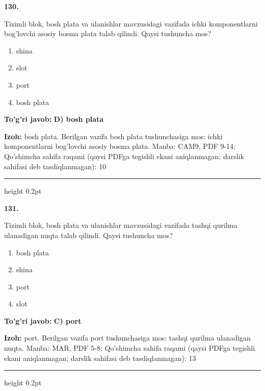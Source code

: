 \documentclass[10pt,a4paper]{article}
\begin{document}
{\bfseries\sffamily\color{ink} 130.}
\par
Tizimli blok, bosh plata va ulanishlar mavzusidagi vazifada ichki komponentlarni bog'lovchi asosiy bosma plata talab qilindi. Qaysi tushuncha mos?
\begin{enumerate}[label=\Alph*),leftmargin=9mm]
\item shina
\item slot
\item port
\item bosh plata
\end{enumerate}
\begin{tcolorbox}[enhanced,breakable,colback=teal!4,colframe=teal!60!black,boxrule=0.45pt,arc=1.2mm,left=2.7mm,right=2.7mm,top=1.8mm,bottom=1.8mm,before skip=2mm,after skip=2mm]
{\bfseries\sffamily\color{teal}To'g'ri javob:} \textbf{D) bosh plata}
\par\smallskip
{\bfseries Izoh:} bosh plata. Berilgan vazifa bosh plata tushunchasiga mos: ichki komponentlarni bog'lovchi asosiy bosma plata. Manba: CAM9, PDF 9-14; Qo'shimcha sahifa raqami (qaysi PDFga tegishli ekani aniqlanmagan; darslik sahifasi deb tasdiqlanmagan): 10
\end{tcolorbox}
\vspace{2mm}\hrule height 0.2pt\vspace{3mm}

{\bfseries\sffamily\color{ink} 131.}
\par
Tizimli blok, bosh plata va ulanishlar mavzusidagi vazifada tashqi qurilma ulanadigan nuqta talab qilindi. Qaysi tushuncha mos?
\begin{enumerate}[label=\Alph*),leftmargin=9mm]
\item bosh plata
\item shina
\item port
\item slot
\end{enumerate}
\begin{tcolorbox}[enhanced,breakable,colback=teal!4,colframe=teal!60!black,boxrule=0.45pt,arc=1.2mm,left=2.7mm,right=2.7mm,top=1.8mm,bottom=1.8mm,before skip=2mm,after skip=2mm]
{\bfseries\sffamily\color{teal}To'g'ri javob:} \textbf{C) port}
\par\smallskip
{\bfseries Izoh:} port. Berilgan vazifa port tushunchasiga mos: tashqi qurilma ulanadigan nuqta. Manba: MAR, PDF 5-8; Qo'shimcha sahifa raqami (qaysi PDFga tegishli ekani aniqlanmagan; darslik sahifasi deb tasdiqlanmagan): 13
\end{tcolorbox}
\vspace{2mm}\hrule height 0.2pt\vspace{3mm}
\end{document}
